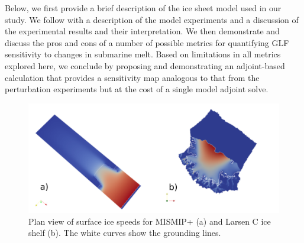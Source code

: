 \documentclass[review,oneside]{igs}
\begin{document}

Below, we first provide a brief description of the ice sheet model used in our study. We follow with a description of the model experiments and a discussion of the experimental results and their interpretation. We then demonstrate and discuss the pros and cons of a number of possible metrics for quantifying GLF sensitivity to changes in submarine melt. Based on limitations in all metrics explored here, we conclude by proposing and demonstrating an adjoint-based calculation that provides a sensitivity map analogous to that from the \cite{reese2018} perturbation experiments but at the cost of a single model adjoint solve.

\begin{figure}
\centering
\includegraphics[width=1\linewidth]{figs/mismip_larsenc.pdf}
\caption{Plan view of surface ice speeds for MISMIP+ (a) and Larsen C ice shelf (b). The white curves show the grounding lines.}
\label{mismip_larsenc}
\end{figure}
\end{document}
